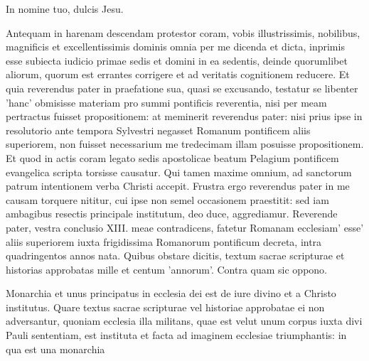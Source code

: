 In nomine tuo, dulcis Jesu.

Antequam in harenam descendam protestor coram, vobis illustrissimis, nobilibus, magnificis et excellentissimis dominis omnia per me dicenda et dicta, inprimis esse subiecta iudicio primae sedis et domini in ea sedentis, deinde quorumlibet aliorum, quorum est errantes corrigere et ad veritatis cognitionem reducere. Et quia reverendus pater in praefatione sua, quasi se excusando, testatur se libenter 'hanc' obmisisse materiam pro summi pontificis reverentia, nisi per meam pertractus fuisset propositionem: at meminerit reverendus pater: nisi prius ipse in resolutorio ante tempora Sylvestri negasset Romanum pontificem aliis superiorem, non fuisset necessarium me tredecimam illam posuisse propositionem. Et quod in actis coram legato sedis apostolicae beatum Pelagium pontificem evangelica scripta torsisse causatur. Qui tamen maxime omnium, ad sanctorum patrum intentionem verba Christi accepit. Frustra ergo reverendus pater in me causam torquere nititur, cui ipse non semel occasionem praestitit: sed iam ambagibus resectis principale institutum, deo duce, aggrediamur. Reverende pater, vestra conclusio XIII. meae contradicens, fatetur Romanam ecclesiam' esse' aliis superiorem iuxta frigidissima Romanorum pontificum decreta, intra quadringentos annos nata. Quibus obstare dicitis, textum sacrae scripturae et historias approbatas mille et centum 'annorum'. Contra quam sic oppono.

Monarchia et unus principatus in ecclesia dei est de iure divino et a Christo institutus. Quare textus sacrae scripturae vel historiae approbatae ei non adversantur, quoniam ecclesia illa militans, quae est velut unum corpus iuxta divi Pauli sententiam, est instituta et facta ad imaginem ecclesiae triumphantis: in qua est una monarchia

